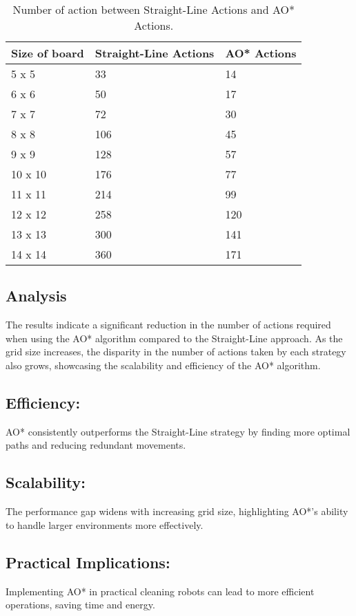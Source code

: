 \documentclass{article}
\begin{document}
\begin{table}[h]\centering
  \begin{tabular}{lll}
    \toprule
    Size of board& Straight-Line Actions & AO{*} Actions\\
    \midrule
    5 x 5& 33 & 14\\
    \midrule
    6 x 6& 50&17\\
    \midrule
    7 x 7& 72&30\\
    \midrule
    8 x 8&106&45\\
    \midrule
    9 x 9& 128&57\\
    \midrule
    10 x 10& 176& 77\\
    \midrule
    11 x 11& 214& 99\\
    \midrule
    12 x 12& 258& 120\\
    \midrule
    13 x 13& 300& 141\\
    \midrule
    14 x 14& 360& 171\\
     
    \bottomrule
  \end{tabular}
  \caption{Number of action between Straight-Line Actions and AO{*} Actions. }
  \label{tab:resultsEasy}
\end{table}
 
 


\subsection{Analysis}
The results indicate a significant reduction in the number of actions required when using the AO* algorithm compared to the Straight-Line approach. As the grid size increases, the disparity in the number of actions taken by each strategy also grows, showcasing the scalability and efficiency of the AO* algorithm.

\subsection{Efficiency:} AO* consistently outperforms the Straight-Line strategy by finding more optimal paths and reducing redundant movements.
\subsection{Scalability:} The performance gap widens with increasing grid size, highlighting AO*'s ability to handle larger environments more effectively.
\subsection{Practical Implications:} Implementing AO* in practical cleaning robots can lead to more efficient operations, saving time and energy.
\end{document}
